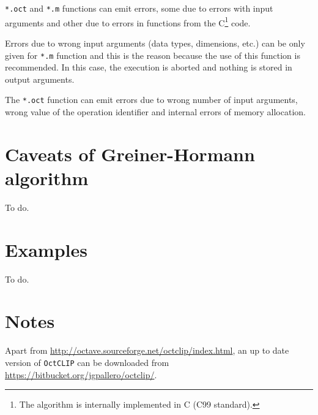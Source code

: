 \documentclass[10pt,a4paper]{article}
\newcommand{\octclip}{\texttt{OctCLIP}}
\begin{document}
\texttt{*.oct} and \texttt{*.m} functions can emit errors, some due to errors
with input arguments and other due to errors in functions from the
C\footnote{The algorithm is internally implemented in C (C99 standard).} code.

Errors due to wrong input arguments (data types, dimensions, etc.) can be only
given for \texttt{*.m} function and this is the reason because the use of this
function is recommended. In this case, the execution is aborted and nothing is
stored in output arguments.

The \texttt{*.oct} function can emit errors due to wrong number of input
arguments, wrong value of the operation identifier and internal errors of memory
allocation.

\section{Caveats of Greiner-Hormann algorithm}

To do.

\section{Examples}

To do.

\section{Notes}

Apart from \url{http://octave.sourceforge.net/octclip/index.html}, an up to date
version of \octclip{} can be downloaded from
\url{https://bitbucket.org/jgpallero/octclip/}.
\end{document}
